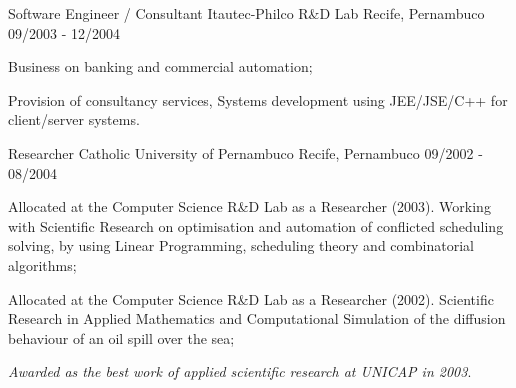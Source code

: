 \begin{cventries}
\cventry
{Software Engineer / Consultant}
{Itautec-Philco R\&D Lab}
{Recife, Pernambuco}
{09/2003 - 12/2004}
{
\begin{cvitems}
\item Business on banking and commercial automation;
\item Provision of consultancy services, Systems development using JEE/JSE/C++ for client/server systems.
\end{cvitems}
}

\cventry
{Researcher}
{Catholic University of Pernambuco}
{Recife, Pernambuco}
{09/2002 - 08/2004}
{
\begin{cvitems}
\item Allocated at the Computer Science R\&D Lab as a Researcher (2003). Working with Scientific Research on optimisation and automation of conflicted scheduling solving, by using Linear Programming, scheduling theory and combinatorial algorithms;
\item Allocated at the Computer Science R\&D Lab as a Researcher (2002). Scientific Research in Applied Mathematics and Computational Simulation of the diffusion behaviour of an oil spill over the sea;
\item \textit{Awarded as the best work of applied scientific research at UNICAP in 2003}.
\end{cvitems}
}

\end{cventries}

\pagebreak

